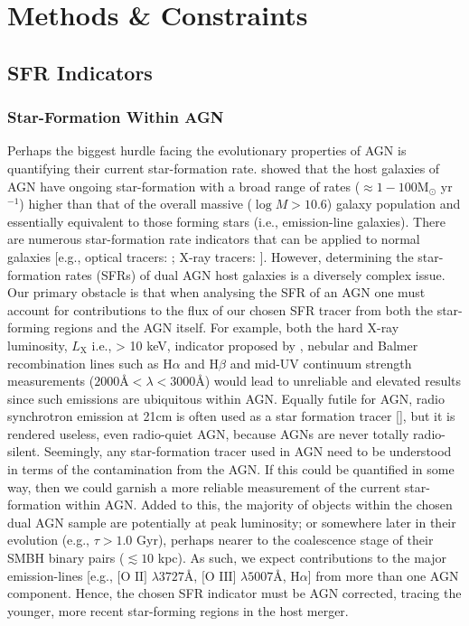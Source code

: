 \section{Methods \& Constraints}
\subsection{SFR Indicators}

\subsubsection{Star-Formation Within AGN}

Perhaps the biggest hurdle facing the evolutionary properties of AGN is quantifying their current star-formation rate. \cite{Silverman_2009} showed that the host galaxies of AGN have ongoing star-formation with a broad range of rates ($\approx{1-100}$M$_{\odot}$ yr$^{-1}$) higher than that of the overall massive ($\log{M}>{10.6}$) galaxy population and essentially equivalent to those forming stars (i.e., emission-line galaxies). There are numerous star-formation rate indicators that can be applied to normal galaxies [e.g., optical tracers: \cite{Kennicutt_1998}; X-ray tracers: \cite{Gilfanov_2004}]. However, determining the star-formation rates (SFRs) of dual AGN host galaxies is a diversely complex issue. Our primary obstacle is that when analysing the SFR of an AGN one must account for contributions to the flux of our chosen SFR tracer from both the star-forming regions and the AGN itself. For example, both the hard X-ray luminosity, $L_{\text{X}}$ i.e., > 10 keV, indicator proposed by \cite{Gilfanov_2004}, nebular and Balmer recombination lines such as $\text{H}\alpha$ and $\text{H}\beta$ and mid-UV continuum strength measurements (${2000}Å<{\lambda}<3000Å$) would lead to unreliable and elevated results since such emissions are ubiquitous within AGN. Equally futile for AGN, radio synchrotron emission at 21cm is often used as a star formation tracer [\cite{1983A&A...120..219K}], but it is rendered useless, even radio-quiet AGN, because AGNs are never totally radio-silent. Seemingly, any star-formation tracer used in AGN need to be understood in terms of the contamination from the AGN. If this could be quantified in some way, then we could garnish a more reliable measurement of the current star-formation within AGN. Added to this, the majority of objects within the chosen dual AGN sample are potentially at peak luminosity; or somewhere later in their evolution (e.g., ${\tau}>{1.0}$ Gyr), perhaps nearer to the coalescence stage of their SMBH binary pairs ($\lesssim{10}$ kpc). As such, we expect contributions to the major emission-lines [e.g., $\text{[O II]}$ $\lambda{3727}Å$, $\text{[O III]}$ $\lambda{5007}Å$, $\text{H}\alpha$] from more than one AGN component. Hence, the chosen SFR indicator must be AGN corrected, tracing the younger, more recent star-forming regions in the host merger.

